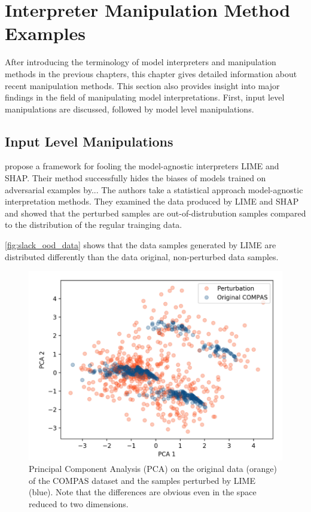 \section{Interpreter Manipulation Method Examples}
\label{sec:manipulations}

After introducing the terminology of model interpreters and manipulation methods in the previous chapters, this chapter gives detailed information about recent manipulation methods. This section also provides insight into major findings in the field of manipulating model interpretations. First, input level manipulations are discussed, followed by model level manipulations. 

\subsection{Input Level Manipulations}

\cite{advlime_aies20} propose a framework for fooling the model-agnostic interpreters LIME and SHAP. Their method successfully hides the biases of models trained on adversarial examples by... 
The authors take a statistical approach model-agnostic interpretation methods. They examined the data produced by LIME and SHAP and showed that the perturbed samples are out-of-distrubution samples compared to the distribution of the regular trainging data. 

\autoref{fig:slack_ood_data} shows that the data samples generated by LIME are distributed differently than the data original, non-perturbed data samples. 

\begin{figure}[ht]
    \centering
    \includegraphics[width=\linewidth]{figures/slack_ood_data.png}
    \caption{Principal Component Analysis (PCA) on the original data (orange) of the COMPAS dataset and the samples perturbed by LIME (blue). Note that the differences are obvious even in the space reduced to two dimensions.}
    \label{fig:slack_ood_data}
    \vspace{-0.3cm}
\end{figure}





